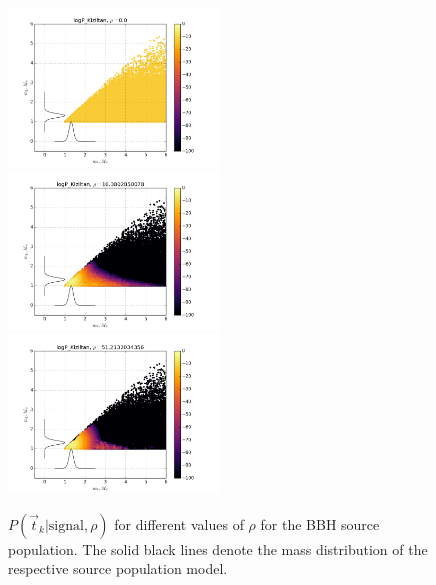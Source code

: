 \documentclass[twocolumn,showpacs,unsortedaddress,superscriptaddress,showkeys,nofootinbib,preprintnumbers,letterpaper]{revtex4-1}
\begin{document}
\begin{figure}
\includegraphics[width=0.5\textwidth]{logP_Kiziltanrho0_0.png}
\includegraphics[width=0.5\textwidth]{logP_Kiziltanrho16_3802850078.png}
\includegraphics[width=0.5\textwidth]{logP_Kiziltanrho51_2132034356.png}
\caption{$P(\vec{t}_k|\text{signal},\rho)$ for different values of $\rho$ for the BBH source population. The solid black lines denote the mass distribution of the respective source population model.}
\end{figure}
\end{document}
